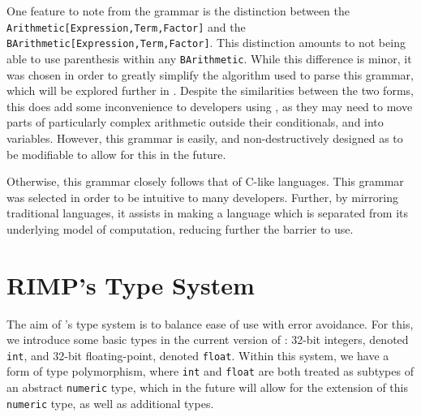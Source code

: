 One feature to note from the grammar is the distinction between the \\\lstinline{Arithmetic[Expression,Term,Factor]} and the \lstinline{BArithmetic[Expression,Term,Factor]}.
This distinction amounts to not being able to use parenthesis within any \lstinline{BArithmetic}. While this difference is minor, it was chosen in order to greatly simplify the algorithm used to parse this grammar, which will be explored further in .
Despite the similarities between the two forms, this does add some inconvenience to developers using \rimp, as they may need to move parts of particularly complex arithmetic outside their conditionals, and into variables. However, this grammar is easily, and non-destructively designed as to be modifiable to allow for this in the future.

Otherwise, this grammar closely follows that of C-like languages. This grammar was selected in order to be intuitive to many developers. Further, by mirroring traditional languages, it assists in making \rimplang a language which is separated from its underlying model of computation, reducing further the barrier to use.

\section{RIMP's Type System}

The aim of \rimp's type system is to balance ease of use with error avoidance. For this, we introduce some basic types in the current version of \rimp: 32-bit integers, denoted \lstinline{int}, and 32-bit floating-point, denoted \lstinline{float}. Within this system, we have a form of type polymorphism, where \lstinline{int} and \lstinline{float} are both treated as subtypes of an abstract \lstinline{numeric} type, which in the future will allow for the extension of this \lstinline{numeric} type, as well as additional types.

